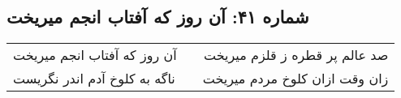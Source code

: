 \begin{center}
\section*{شماره ۴۱: آن روز که آفتاب انجم میریخت}
\label{sec:041}
\begin{longtable}{l p{0.5cm} r}
آن روز که آفتاب انجم میریخت
&&
صد عالم پر قطره ز قلزم میریخت
\\
ناگه به کلوخ آدم اندر نگریست
&&
زان وقت ازان کلوخ مردم میریخت
\\
\end{longtable}
\end{center}

